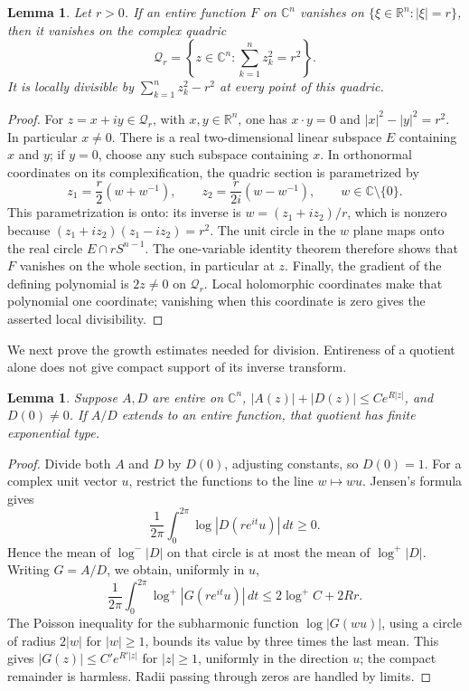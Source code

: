 \documentclass[a4paper,12pt,reqno]{amsart}
\newtheorem{lemma}[theorem]{Lemma}
\theoremstyle{remark}
\numberwithin{equation}{section}
\newcommand{\R}{\mathbb R}
\newcommand{\C}{\mathbb C}
\begin{document}
\begin{lemma}\label{cm:lem:quadric}
Let $r>0$. If an entire function $F$ on $\C^n$ vanishes on
$\{\xi\in\R^n:|\xi|=r\}$, then it vanishes on the complex quadric
\[
 \mathcal Q_r=\left\{z\in\C^n:\sum_{k=1}^n z_k^2=r^2\right\}.
\]
It is locally divisible by $\sum_{k=1}^n z_k^2-r^2$ at every point
of this quadric.
\end{lemma}

\begin{proof}
For $z=x+iy\in\mathcal Q_r$, with $x,y\in\R^n$, one has
$x\cdot y=0$ and $|x|^2-|y|^2=r^2$. In particular $x\ne0$.
There is a real two-dimensional linear subspace $E$ containing
$x$ and $y$; if $y=0$, choose any such subspace containing $x$.
In orthonormal coordinates on its complexification, the quadric
section is parametrized by
\[
 z_1=\frac r2(w+w^{-1}),\qquad
 z_2=\frac r{2i}(w-w^{-1}),\qquad w\in\C\setminus\{0\}.
\]
This parametrization is onto: its inverse is $w=(z_1+iz_2)/r$,
which is nonzero because $(z_1+iz_2)(z_1-iz_2)=r^2$.
The unit circle in the $w$ plane maps onto the real circle
$E\cap rS^{n-1}$. The one-variable identity theorem therefore
shows that $F$ vanishes on the whole section, in particular at $z$.
Finally, the gradient of the defining polynomial is $2z\ne0$ on
$\mathcal Q_r$. Local holomorphic coordinates make that polynomial
one coordinate; vanishing when this coordinate is zero gives the
asserted local divisibility.
\end{proof}

We next prove the growth estimates needed for division. Entireness
of a quotient alone does not give compact support of its inverse
transform.

\begin{lemma}\label{cm:lem:type}
Suppose $A,D$ are entire on $\C^n$,
$|A(z)|+|D(z)|\leq C e^{R|z|}$, and $D(0)\ne0$.
If $A/D$ extends to an entire function, that quotient has finite
exponential type.
\end{lemma}

\begin{proof}
Divide both $A$ and $D$ by $D(0)$, adjusting constants, so $D(0)=1$.
For a complex unit vector $u$, restrict the functions to the line
$w\mapsto wu$. Jensen's formula gives
\[
 \frac1{2\pi}\int_0^{2\pi}\log|D(re^{it}u)|\,dt\geq0.
\]
Hence the mean of $\log^-|D|$ on that circle is at most the mean
of $\log^+|D|$. Writing $G=A/D$, we obtain, uniformly in $u$,
\[
 \frac1{2\pi}\int_0^{2\pi}\log^+|G(re^{it}u)|\,dt
       \leq 2\log^+C+2Rr.
\]
The Poisson inequality for the subharmonic function
$\log|G(wu)|$, using a circle of radius $2|w|$ for $|w|\geq1$,
bounds its value by three times the last mean. This gives
$|G(z)|\leq C' e^{R'|z|}$ for $|z|\geq1$, uniformly in the
direction $u$; the compact remainder is harmless. Radii passing
through zeros are handled by limits.
\end{proof}
\end{document}
